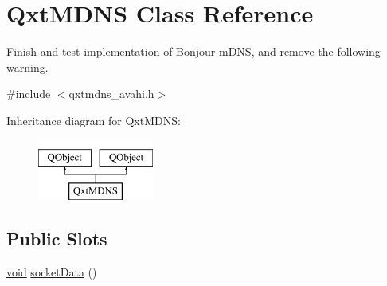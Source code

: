 \hypertarget{class_qxt_m_d_n_s}{\section{Qxt\-M\-D\-N\-S Class Reference}
\label{class_qxt_m_d_n_s}
}


Finish and test implementation of Bonjour m\-D\-N\-S, and remove the following warning.  




{\ttfamily \#include $<$qxtmdns\-\_\-avahi.\-h$>$}

Inheritance diagram for Qxt\-M\-D\-N\-S\-:\begin{figure}[H]
\begin{center}
\leavevmode
\includegraphics[height=2.000000cm]{class_qxt_m_d_n_s}
\end{center}
\end{figure}
\subsection*{Public Slots}
\begin{DoxyCompactItemize}
\item 
\hyperlink{group___u_a_v_objects_plugin_ga444cf2ff3f0ecbe028adce838d373f5c}{void} \hyperlink{class_qxt_m_d_n_s_abbc556c06d69a5c421298d221600d227}{socket\-Data} ()
\end{DoxyCompactItemize}

